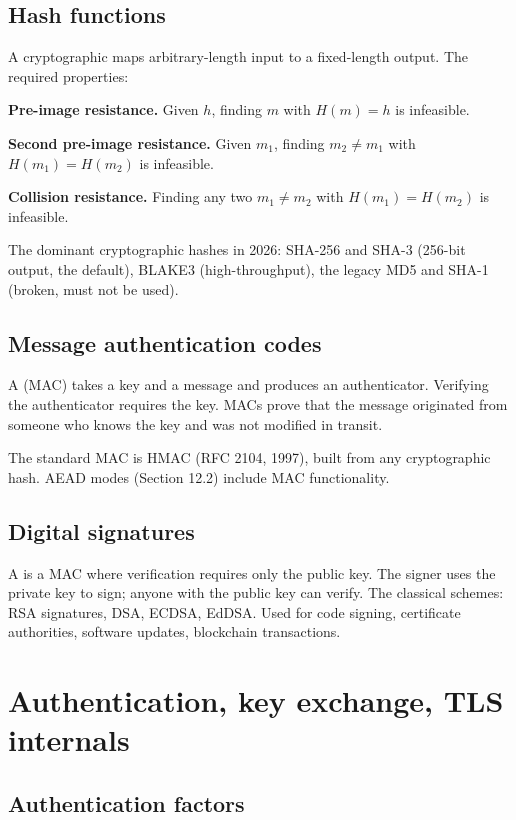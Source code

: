 \subsection{Hash functions}

A cryptographic  maps arbitrary-length input to a fixed-length output. The required properties:

\textbf{Pre-image resistance.} Given $h$, finding $m$ with $H(m) = h$ is infeasible.

\textbf{Second pre-image resistance.} Given $m_1$, finding $m_2 \neq m_1$ with $H(m_1) = H(m_2)$ is infeasible.

\textbf{Collision resistance.} Finding any two $m_1 \neq m_2$ with $H(m_1) = H(m_2)$ is infeasible.

The dominant cryptographic hashes in 2026: SHA-256 and SHA-3 (256-bit output, the default), BLAKE3 (high-throughput), the legacy MD5 and SHA-1 (broken, must not be used).

\subsection{Message authentication codes}

A  (MAC) takes a key and a message and produces an authenticator. Verifying the authenticator requires the key. MACs prove that the message originated from someone who knows the key and was not modified in transit.

The standard MAC is HMAC (RFC 2104, 1997), built from any cryptographic hash. AEAD modes (Section 12.2) include MAC functionality.

\subsection{Digital signatures}

A  is a MAC where verification requires only the public key. The signer uses the private key to sign; anyone with the public key can verify. The classical schemes: RSA signatures, DSA, ECDSA, EdDSA. Used for code signing, certificate authorities, software updates, blockchain transactions.

\section{Authentication, key exchange, TLS internals}

\subsection{Authentication factors}

